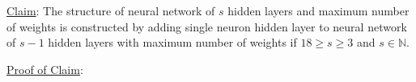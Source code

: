 \documentclass[12pt]{article}
\newcommand{\ParTh}[1]{\left(#1\right)}
\begin{document}
\begin{enumerate}

\end{enumerate}
\underline{Claim}: The structure of neural network of $s$ hidden layers and maximum number of weights is constructed by adding single neuron hidden layer to neural network of $s-1$ hidden layers with maximum number of weights if $18\geq s\geq3$ and $s\in\mathbb{N}$.

\underline{Proof of Claim}:
\end{document}
